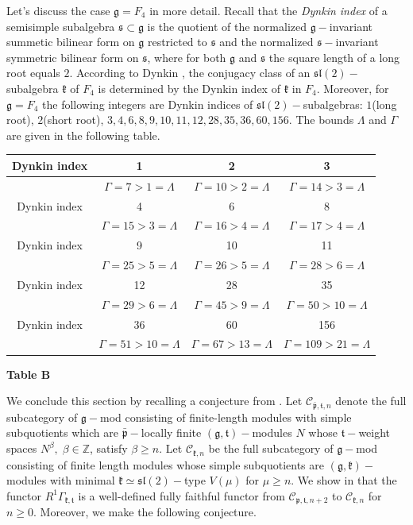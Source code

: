 \documentclass[10pt]{amsart}
\renewcommand{\gg}{\mathfrak{g}}
\newcommand{\kk}{\mathfrak{k}}
\newcommand{\pp}{\mathfrak{p}}
\renewcommand{\ss}{\mathfrak{s}}
\renewcommand{\tt}{\mathfrak{t}}
\renewcommand{\sl}{\mathfrak{sl}}
\begin{document}
Let's discuss the case $\gg = F_4$ in more detail. Recall that the \textit{Dynkin index} of a semisimple subalgebra $\ss \subset \gg$ is the quotient of the normalized $\gg-$invariant summetic bilinear form on $\gg$ restricted to $\ss$ and the normalized $\ss-$invariant symmetric bilinear form on $\ss$, where for both $\gg$ and $\ss$ the square length of a long root equals $2$. According to Dynkin \cite{D}, the conjugacy class of an $\sl(2)-$subalgebra $\kk$ of $F_4$ is determined by the Dynkin index of $\kk$ in $F_4$. Moreover, for $\gg = F_4$ the following integers are Dynkin indices of $\sl(2)-$subalgebras: $1$(long root), $2$(short root), $3,4,6,8,9,10,11,12,28,35,36,60,156.$ The bounds $\Lambda$ and $\Gamma$ are given in the following table.

\begin{table}[ht]
\begin{center}
\begin{tabular}{|c|c|c|c|}\hline
Dynkin index & 1 & 2 & 3\\\hline 
  & $\Gamma = 7 > 1 =\Lambda$ & $\Gamma = 10 > 2 =\Lambda$ & $\Gamma = 14 > 3 =\Lambda$\\\hline
Dynkin index & 4 & 6 & 8\\\hline
  & $\Gamma = 15 > 3 =\Lambda$ & $\Gamma = 16 > 4 =\Lambda$ & $\Gamma = 17 > 4 =\Lambda$\\\hline
Dynkin index & 9 & 10 & 11\\\hline
  & $\Gamma = 25 > 5 =\Lambda$ & $\Gamma = 26 > 5 =\Lambda$ & $\Gamma = 28 > 6 =\Lambda$\\\hline
Dynkin index & 12 & 28 & 35\\\hline
  & $\Gamma = 29 > 6 =\Lambda$ & $\Gamma = 45 > 9 =\Lambda$ & $\Gamma = 50 > 10 =\Lambda$\\\hline
Dynkin index & 36 & 60 & 156\\\hline
  & $\Gamma = 51 > 10 =\Lambda$ & $\Gamma = 67 > 13 =\Lambda$ & $\Gamma = 109 > 21 =\Lambda$\\\hline
\end{tabular}
\end{center}
\end{table}

\begin{center}
 \textbf{Table B}
\end{center}

\vspace{0.5cm}

We conclude this section by recalling a conjecture from \cite{PZ5}. Let $\mathcal{C}_{\bar{\pp},\tt,n}$ denote the full subcategory of $\gg-$mod consisting of finite-length modules with simple subquotients which are $\bar{\pp}-$locally finite $(\gg,\tt)-$modules $N$ whose $\tt-$weight spaces $N^{\beta},\;\beta \in \mathbb{Z}$, satisfy $\beta \geq n$. Let $\mathcal{C}_{\kk,n}$ be the full subcategory of $\gg-$mod consisting of finite length modules whose simple subquotients are $(\gg,\kk)-$modules with minimal $\kk \simeq \sl(2)-$type $V(\mu)$ for $\mu \geq n$. We show in \cite{PZ5} that the functor $R^{1}\Gamma_{\kk,\tt}$ is a well-defined fully faithful functor from $\mathcal{C}_{\pp,\tt,n+2}$ to $\mathcal{C}_{\kk,n}$ for $n \geq 0$. Moreover, we make the following conjecture.
\end{document}
